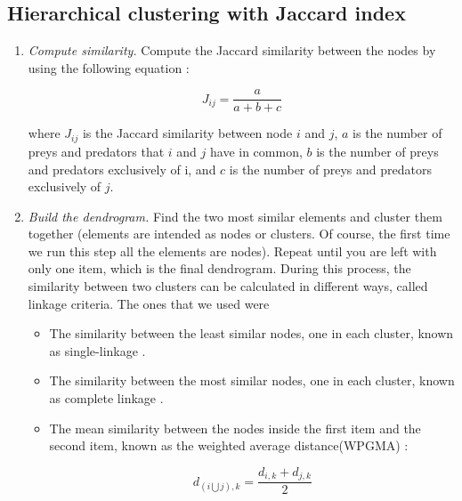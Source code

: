 \documentclass[twocolumn]{article}
\begin{document}
\onecolumn
\begin{appendices}

	\section{Hierarchical clustering with Jaccard index} \label{appendix:jaccard}

		\begin{enumerate}

			\item \emph{Compute similarity.} \smallskip \newline
						Compute the Jaccard similarity between the nodes by using the following equation \citep{Yodzis1999}:

										\begin{equation}
				      				J_{ij}=\frac{a}{a+b+c} \label{eqn:jaccard}
			      				\end{equation}

			      \noindent where $J_{ij}$ is the Jaccard similarity between node $i$ and $j$, $a$ is the number of preys and predators that $i$ and $j$ have in common, $b$ is the number of preys and predators exclusively of i, and $c$ is the number of preys and predators exclusively of $j$.

			\item \emph{Build the dendrogram.} \smallskip \newline
			      Find the two most similar elements and cluster them together (elements are intended as nodes or clusters. Of course, the first time we run this step all the elements are nodes). Repeat until you are left with only one item, which is the final dendrogram. During this process, the similarity between two clusters can be calculated in different ways, called linkage criteria. The ones that we used were

						\begin{itemize}
				      \item 	The similarity between the least similar nodes, one in each cluster, known as single-linkage \citep{Frigui2008}.
				      \item 	The similarity between the most similar nodes, one in each cluster, known as complete linkage \citep{Frigui2008}.
				      \item 	The mean similarity between the nodes inside the first item and the second item, known as the weighted average distance(WPGMA) \citep{Sokal1958}:

				            	\begin{equation}
					            	d_{(i \bigcup j),k}=\frac{d_{i,k}+d_{j,k}}{2} \label{eqn:WPGMA}
				            	\end{equation}


\end{itemize}
\end{enumerate}
\end{appendices}
\end{document}

